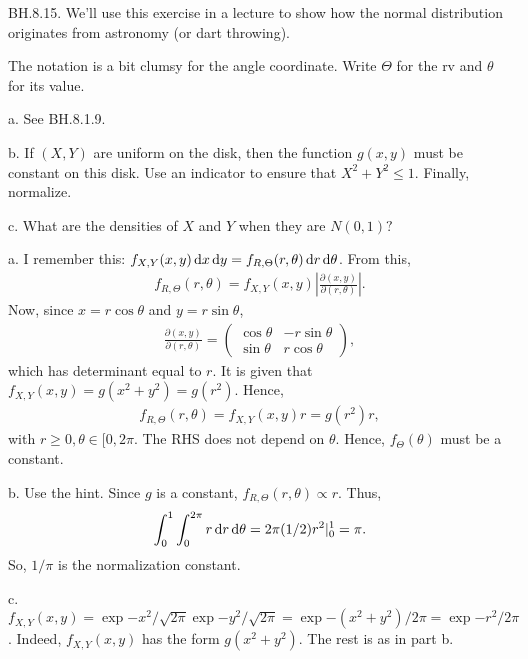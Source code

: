 \setcounter{theorem}{14}
\begin{exercise} BH.8.15. We'll use this exercise in a lecture to show how the normal distribution originates from astronomy (or dart throwing).

The notation is a bit clumsy for the angle coordinate. Write $\Theta$ for the rv and $\theta$ for its value.
\begin{hint}
a. See BH.8.1.9.

b. If $(X,Y)$ are uniform on the disk, then the function $g(x,y)$ must be constant on this disk. Use an indicator to ensure that $X^2+Y^2\leq 1$. Finally, normalize.

c. What are the densities of $X$ and $Y$ when they are $N(0,1)?$
\end{hint}

\begin{solution}
a.  I remember this: $f_{X,Y}(x,y) \,\textrm{d}x \,\textrm{d}y = f_{R, \Theta}(r, \theta) \,\textrm{d}r \,\textrm{d}\theta$. From this,
\begin{align*}
f_{R, \Theta}(r, \theta)  = f_{X,Y}(x,y) \left| \frac{\partial (x,y)}{\partial(r, \theta)} \right|.
\end{align*}
Now, since $x=r\cos \theta$ and $y=r \sin \theta$,
\begin{align*}
\frac{\partial (x,y)}{\partial(r, \theta)} =
  \begin{pmatrix}
    \cos \theta & -r \sin \theta \\
 \sin \theta & r \cos \theta
  \end{pmatrix},
\end{align*}
which has determinant equal to $r$.
It is given that $f_{X,Y}(x,y)=g(x^2+y^2) = g(r^2)$. Hence,
\begin{align*}
f_{R, \Theta}(r, \theta)  = f_{X,Y}(x,y) r = g(r^2)r,
\end{align*}
with $r\geq 0, \theta\in[0, 2\pi$.
The RHS  does not  depend on $\theta$. Hence, $f_{\Theta}(\theta)$ must be a constant.

b. Use the hint. Since $g$ is a constant, $f_{R, \Theta}(r, \theta) \propto r$. Thus,
\begin{align*}
  \int_{0}^{1}\int_{0}^{2\pi} r \,\textrm{d}r \,\textrm{d}\theta = 2\pi (1/2) r^{2}|_0^{1} = \pi.
\end{align*}
So, $1/\pi$ is the normalization constant.

c. $f_{X,Y}(x,y) = \exp{-x^2}/\sqrt{2\pi}\exp{-y^{2}}/\sqrt{2\pi} = \exp{-(x^2+y^2)/2\pi} = \exp{-r^{2}}/2\pi$. Indeed, $f_{X,Y}(x,y)$ has the form $g(x^2+y^2)$. The rest is as in part b.
\end{solution}
\end{exercise}

